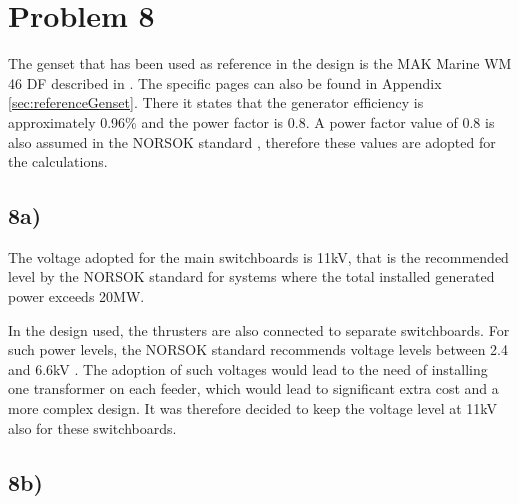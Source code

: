 \section*{Problem 8}
The genset that has been used as reference in the design is the MAK Marine WM 46 DF described in \cite[p.128 -129]{CatGenerators}. The specific pages can also be found in Appendix \ref{sec:referenceGenset}. There it states that the generator efficiency is approximately 0.96\% and the power factor is 0.8. A power factor value of 0.8 is also assumed in the NORSOK standard \cite{NORSOKstandard}, therefore these values are adopted for the calculations. 

\subsection*{8a)}
The voltage adopted for the main switchboards is 11kV, that is the recommended level by the NORSOK standard \cite[p.10]{NORSOKstandard} for systems where the total installed generated power exceeds 20MW.

In the design used, the thrusters are also connected to separate switchboards. For such power levels, the NORSOK standard recommends voltage levels between 2.4 and 6.6kV \cite{NORSOKstandard}. The adoption of such voltages would lead to the need of installing one transformer on each feeder, which would lead to significant extra cost and a more complex design. It was therefore decided to keep the voltage level at 11kV also for these switchboards.   




\subsection*{8b)}


